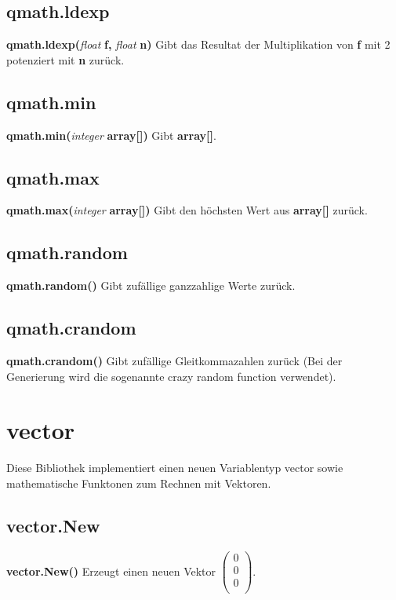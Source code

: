 \documentclass[11pt,a4paper]{book}
\begin{document}
\subsection{qmath.ldexp}
\label{qm-ldexp}
\textbf{qmath.ldexp(}\textit{float}\textbf{ f, }\textit{float}\textbf{ n)}
\newline
Gibt das Resultat der Multiplikation von \textbf{f} mit 2 potenziert mit \textbf{n} zurück.
\subsection{qmath.min}
\label{qm-min}
\textbf{qmath.min(}\textit{integer}\textbf{ array[])}
\newline
Gibt \textbf{array[]}.
\subsection{qmath.max}
\label{qm-max}
\textbf{qmath.max(}\textit{integer}\textbf{ array[])}
\newline
Gibt den höchsten Wert aus \textbf{array[]} zurück.
\subsection{qmath.random}
\label{qm-random}
\textbf{qmath.random()}
\newline
Gibt zufällige ganzzahlige Werte zurück.
\subsection{qmath.crandom}
\label{qm-crandom}
\textbf{qmath.crandom()}
\newline
Gibt zufällige Gleitkommazahlen zurück (Bei der Generierung wird die sogenannte crazy random function verwendet).
\newpage
\section{vector}
\label{vect}
Diese Bibliothek implementiert einen neuen Variablentyp vector sowie mathematische Funktonen zum Rechnen mit Vektoren.
\subsection{vector.New}
\label{vect-new}
\textbf{vector.New()}
\newline
Erzeugt einen neuen Vektor \begin{math}\left(\begin{array}{c} 0 \\ 0 \\ 0 \\ \end{array}\right)\end{math}.
\end{document}
